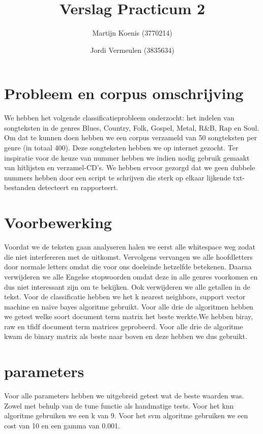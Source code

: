 \documentclass[a4paper,oneside]{article}
\begin{document}
\title{Verslag Practicum 2}
\author{Martijn Koenis (3770214) \and Jordi Vermeulen (3835634)}
\date{}
\maketitle

\begin{abstract}
\end{abstract}

\section{Probleem en corpus omschrijving}
We hebben het volgende classificatieprobleem onderzocht: het indelen van songteksten in de genres Blues, Country, Folk, Gospel, Metal, R\&B, Rap en Soul.  Om dat te kunnen doen hebben we een corpus verzameld van 50 songteksten per genre (in totaal 400). Deze songteksten hebben we op internet gezocht. Ter inspiratie voor de keuze van nummer hebben we indien nodig gebruik gemaakt van hitlijsten en verzamel-CD's. We hebben ervoor gezorgd dat we geen dubbele nummers hebben door een script te schrijven die sterk op elkaar lijkende txt-bestanden detecteert en rapporteert.

\section{Voorbewerking}
Voordat we de teksten gaan analyseren halen we eerst alle whitespace weg zodat die niet interfereren met de uitkomst. Vervolgens vervangen we alle hoofdletters door normale letters omdat die voor ons doeleinde hetzelfde betekenen. Daarna verwijderen we alle Engelse stopwoorden omdat deze in alle genres voorkomen en dus niet interessant zijn om te bekijken. Ook verwijderen we alle getallen in de tekst. Voor de classificatie hebben we het k nearest neighbors, support vector machine en na\"ive bayes algoritme gebruikt. Voor alle drie de algoritmen hebben we getest welke soort document term matrix het beste werkte.We hebben biray, raw en tfidf document term matrices geprobeerd. Voor alle drie de algoritme kwam de binary matrix als beste naar boven en  deze hebben we dus gebruikt. 

\section{parameters}
Voor alle parameters hebben we uitgebreid getest wat de beste waarden was. Zowel met behulp van de tune functie als handmatige tests. Voor het knn algoritme gebruiken we een k van 9. Voor het svm algoritme gebruiken we een cost van 10 en een gamma van 0.001. 
\end{document}
